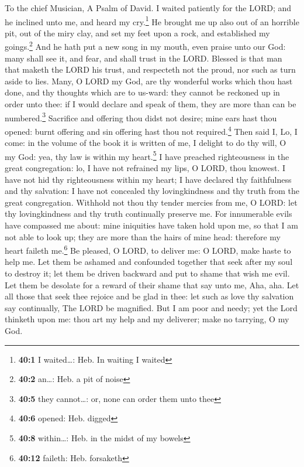To the chief Musician, A Psalm of David.  I waited
patiently for the LORD; and he inclined unto me, and heard my
cry.\footnote{\textbf{40:1} I waited\ldots: Heb. In waiting I waited}
 He brought me up also out of an horrible pit, out of the
miry clay, and set my feet upon a rock, and established my
goings.\footnote{\textbf{40:2} an\ldots: Heb. a pit of noise}
 And he hath put a new song in my mouth, even praise unto
our God: many shall see it, and fear, and shall trust in the LORD.
 Blessed is that man that maketh the LORD his trust, and
respecteth not the proud, nor such as turn aside to lies. 
Many, O LORD my God, are thy wonderful works which thou hast done, and
thy thoughts which are to us-ward: they cannot be reckoned up in order
unto thee: if I would declare and speak of them, they are more than can
be numbered.\footnote{\textbf{40:5} they cannot\ldots: or, none can
  order them unto thee}  Sacrifice and offering thou didst
not desire; mine ears hast thou opened: burnt offering and sin offering
hast thou not required.\footnote{\textbf{40:6} opened: Heb. digged}
 Then said I, Lo, I come: in the volume of the book it is
written of me,  I delight to do thy will, O my God: yea,
thy law is within my heart.\footnote{\textbf{40:8} within\ldots: Heb. in
  the midst of my bowels}  I have preached righteousness
in the great congregation: lo, I have not refrained my lips, O LORD,
thou knowest.  I have not hid thy righteousness within my
heart; I have declared thy faithfulness and thy salvation: I have not
concealed thy lovingkindness and thy truth from the great congregation.
 Withhold not thou thy tender mercies from me, O LORD:
let thy lovingkindness and thy truth continually preserve me.
 For innumerable evils have compassed me about: mine
iniquities have taken hold upon me, so that I am not able to look up;
they are more than the hairs of mine head: therefore my heart faileth
me.\footnote{\textbf{40:12} faileth: Heb. forsaketh}  Be
pleased, O LORD, to deliver me: O LORD, make haste to help me.
 Let them be ashamed and confounded together that seek
after my soul to destroy it; let them be driven backward and put to
shame that wish me evil.  Let them be desolate for a
reward of their shame that say unto me, Aha, aha.  Let
all those that seek thee rejoice and be glad in thee: let such as love
thy salvation say continually, The LORD be magnified. 
But I am poor and needy; yet the Lord thinketh upon me: thou art my help
and my deliverer; make no tarrying, O my God.

